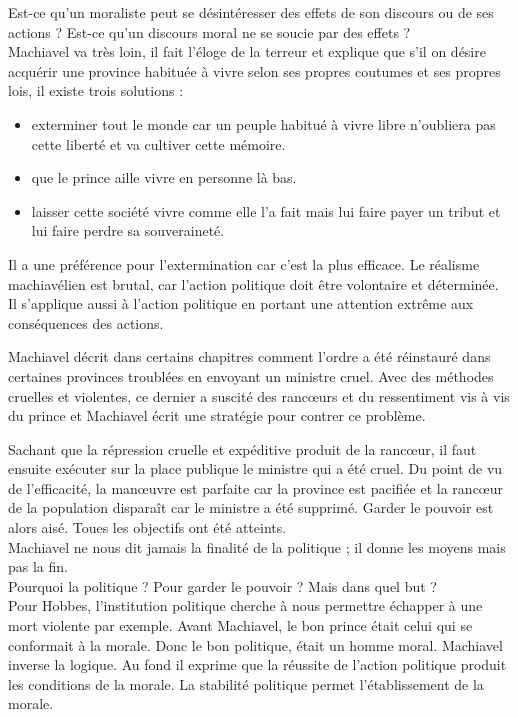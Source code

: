 \documentclass[a4paper,11pt]{article}
\begin{document}
	
	Est-ce qu’un moraliste peut se désintéresser des effets de son discours ou de ses actions ?
	Est-ce qu’un discours moral ne se soucie par des effets ?\\
	
	
	Machiavel va très loin, il fait l’éloge de la terreur et explique que s’il on désire acquérir une province habituée à vivre selon ses propres coutumes et ses propres lois, il existe trois solutions :
	\begin{itemize}
	\item exterminer tout le monde car un peuple habitué à vivre libre n’oubliera pas cette liberté et va cultiver cette mémoire.
	\item que le prince aille vivre en personne là bas.
	\item laisser cette société vivre comme elle l’a fait mais lui faire payer un tribut et lui faire perdre sa souveraineté.
	\end{itemize}
	 
	Il a une préférence pour l’extermination car c’est la plus efficace. Le réalisme machiavélien est brutal, car l’action politique doit être volontaire et déterminée. Il s’applique aussi à l’action politique en portant une attention extrême aux conséquences des actions.
	
	Machiavel décrit dans certains chapitres comment l’ordre a été réinstauré dans certaines provinces troublées en envoyant un ministre cruel. Avec des méthodes cruelles et violentes, ce dernier a suscité des rancœurs et du ressentiment vis à vis du prince et Machiavel écrit une stratégie pour contrer ce problème.
	
	Sachant que la répression cruelle et expéditive produit de la rancœur, il faut ensuite exécuter sur la place publique le ministre qui a été cruel. Du point de vu de l’efficacité, la manœuvre est parfaite car la province est pacifiée et la rancœur de la population disparaît car le ministre a été supprimé. Garder le pouvoir est alors aisé. Toues les objectifs ont été atteints.\\

		
	Machiavel ne nous dit jamais la finalité de la politique ; il donne les moyens mais pas la fin.\\
	
	
	Pourquoi la politique ? Pour garder le pouvoir ? Mais dans quel but ?\\
	
	
	Pour Hobbes, l’institution politique cherche à nous permettre échapper à une mort violente par exemple. Avant Machiavel, le bon prince était celui qui se conformait à la morale. Donc le bon politique, était un homme moral. Machiavel inverse la logique. Au fond il exprime que la réussite de l’action politique produit les conditions de la morale. La stabilité politique permet l’établissement de la morale.
	
\end{document}

